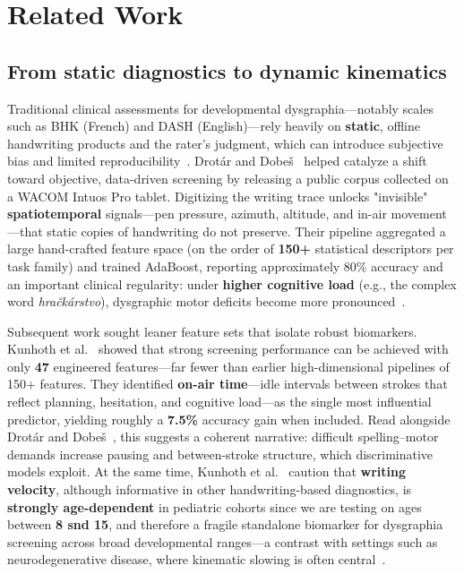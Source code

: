 \documentclass{article}
\begin{document}
\section{Related Work}
\label{sec:related}

\subsection{From static diagnostics to dynamic kinematics}

Traditional clinical assessments for developmental dysgraphia---notably scales such as BHK (French) and DASH (English)---rely heavily on \textbf{static}, offline handwriting products and the rater's judgment, which can introduce subjective bias and limited reproducibility~\cite{chung2019, kunhoth2024}. Drot\'ar and Dobe\v{s}~\cite{drotar2020} helped catalyze a shift toward objective, data-driven screening by releasing a public corpus collected on a WACOM Intuos Pro tablet. Digitizing the writing trace unlocks "invisible" \textbf{spatiotemporal} signals---pen pressure, azimuth, altitude, and in-air movement---that static copies of handwriting do not preserve. Their pipeline aggregated a large hand-crafted feature space (on the order of \textbf{150+} statistical descriptors per task family) and trained AdaBoost, reporting approximately 80\% accuracy and an important clinical regularity: under \textbf{higher cognitive load} (e.g., the complex word \emph{hračkárstvo}), dysgraphic motor deficits become more pronounced~\cite{drotar2020}.

Subsequent work sought leaner feature sets that isolate robust biomarkers. Kunhoth et al.~\cite{kunhoth2022} showed that strong screening performance can be achieved with only \textbf{47} engineered features---far fewer than earlier high-dimensional pipelines of 150+ features. They identified \textbf{on-air time}---idle intervals between strokes that reflect planning, hesitation, and cognitive load---as the single most influential predictor, yielding roughly a \textbf{7.5\%} accuracy gain when included. Read alongside Drot\'ar and Dobe\v{s}~\cite{drotar2020}, this suggests a coherent narrative: difficult spelling--motor demands increase pausing and between-stroke structure, which discriminative models exploit. At the same time, Kunhoth et al.~\cite{kunhoth2022} caution that \textbf{writing velocity}, although informative in other handwriting-based diagnostics, is \textbf{strongly age-dependent} in pediatric cohorts since we are testing on ages between \textbf{8 snd 15}, and therefore a fragile standalone biomarker for dysgraphia screening across broad developmental ranges---a contrast with settings such as neurodegenerative disease, where kinematic slowing is often central~\cite{js2019ad}.
\end{document}
